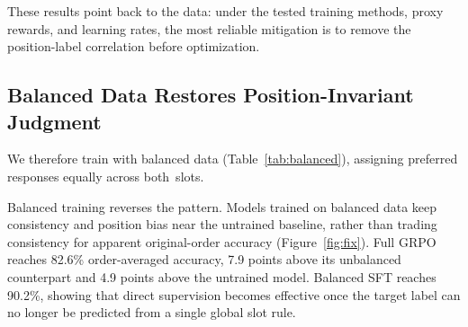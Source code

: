 \documentclass[11pt]{article}
\begin{document}
These results point back to the data: under the tested training methods, proxy rewards, and learning rates, the most reliable mitigation is to remove the position-label correlation before optimization.

\subsection{Balanced Data Restores Position-Invariant Judgment}

We therefore train with balanced data (Table~\ref{tab:balanced}), assigning preferred responses equally across both~slots.

Balanced training reverses the pattern. Models trained on balanced data keep consistency and position bias near the untrained baseline, rather than trading consistency for apparent original-order accuracy (Figure~\ref{fig:fix}). Full GRPO reaches 82.6\% order-averaged accuracy, 7.9 points above its unbalanced counterpart and 4.9 points above the untrained model. Balanced SFT reaches 90.2\%, showing that direct supervision becomes effective once the target label can no longer be predicted from a single global slot rule.

\begin{table}[H]
\centering
\scriptsize
\setlength{\tabcolsep}{2.0pt}
\caption{Balanced training (gold = 50\% A, 50\% B). Multi-seed entries report mean $\pm$ seed standard deviation. Data deconfounding keeps the first-position rate near 50\%, restores position-swap consistency, and improves order-averaged accuracy over the baseline.}
\label{tab:balanced}
\end{table}
\end{document}

